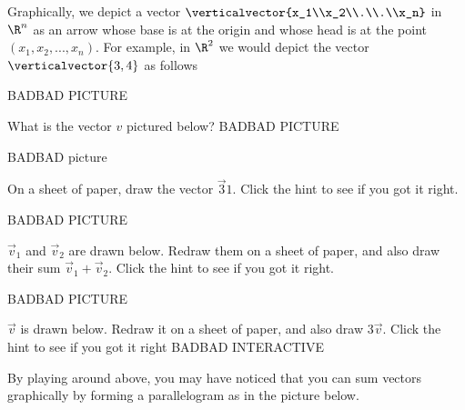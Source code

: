 \documentclass{ximera}
\begin{document}
	Graphically, we depict a vector $\verticalvector{x_1\\x_2\\.\\.\\x_n}$ in $\R^n$ as an arrow whose base is at the origin and whose head is at  the point $(x_1,x_2,...,x_n)$.  
	For example, in $\R^2$ we would depict the vector $\verticalvector{3,4}$ as follows
 	 
 	 BADBAD PICTURE
 	 
 	 \begin{question}
 	 	What is the vector $v$ pictured below?
 	 	BADBAD PICTURE
  	 \end{question}
  	 
  	 \begin{question}
  	 	\begin{hint}
  	 		BADBAD picture
  	 	\end{hint}
  	 	On a sheet of paper, draw the vector $\vec{3}{1}$. Click the hint to see if you got it right.
  	 \end{question}
  	 
  	 \begin{question}
  	 \begin{hint}
  	 	BADBAD PICTURE
  	 \end{hint}
  	 	 $\vec{v}_1$ and $\vec{v}_2$ are drawn below.  Redraw them on a sheet of paper, and also draw their sum $\vec{v}_1+\vec{v}_2$.
  	 	 Click the hint to see if you got it right.
  	 	
  	 \end{question}
  	 
  	 \begin{question}
  	 \begin{hint}
  	 BADBAD PICTURE
  	 \end{hint}
  	 	$\vec{v}$ is drawn below.  Redraw it on a sheet of paper, and also draw $3\vec{v}$.  Click the hint to see if you got it right
  	 	BADBAD INTERACTIVE
  	 \end{question}
  	 
  	 
  		By playing around above, you may have noticed that you can sum vectors graphically by forming a parallelogram as in the picture below.
  		
\end{document}
